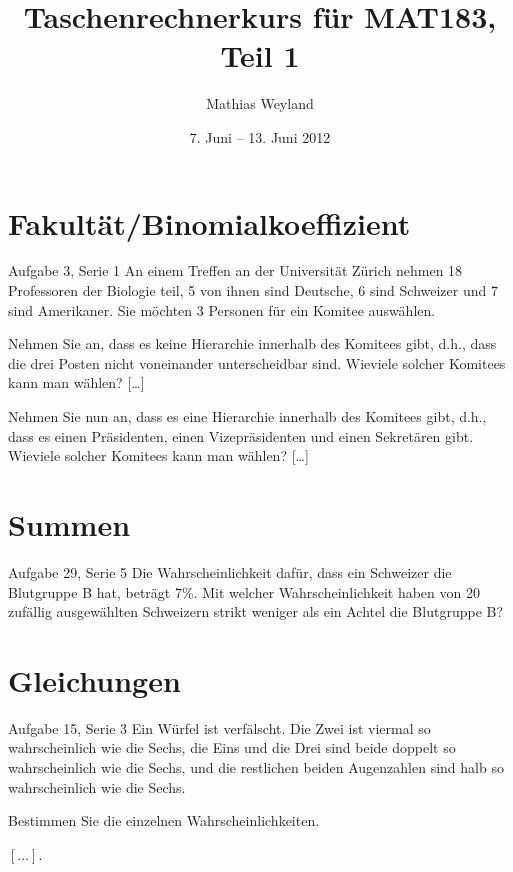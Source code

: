 \documentclass{beamer}
\title{Taschenrechnerkurs für MAT183, Teil 1}
\author{Mathias Weyland}
\date{7. Juni -- 13. Juni 2012}
\begin{document}
\frame{\maketitle}


\section{Fakultät/Binomialkoeffizient}

\begin{frame}{Aufgabe 3, Serie 1}
An einem Treffen an der Universität Zürich nehmen 18 Professoren der Biologie teil, 5 von
ihnen sind Deutsche, 6 sind Schweizer und 7 sind Amerikaner. Sie möchten 3 Personen
für ein Komitee auswählen.

\begin{outline}
\item Nehmen Sie an, dass es keine Hierarchie innerhalb des Komitees gibt, d.h., dass die
drei Posten nicht voneinander unterscheidbar sind. Wieviele solcher Komitees kann
man wählen? [\ldots]\pause
\item Nehmen Sie nun an, dass es eine Hierarchie innerhalb des Komitees gibt, d.h., dass es
einen Präsidenten, einen Vizepräsidenten und einen Sekretären gibt. Wieviele solcher
Komitees kann man wählen? [\ldots]
\end{outline}
\end{frame}

\section{Summen}
\begin{frame}{Aufgabe 29, Serie 5}
Die Wahrscheinlichkeit dafür, dass ein Schweizer die Blutgruppe B hat, beträgt 7\%. Mit
welcher Wahrscheinlichkeit haben von 20 zufällig ausgewählten Schweizern strikt weniger
als ein Achtel die Blutgruppe B?
\end{frame}

\section{Gleichungen}
\begin{frame}{Aufgabe 15, Serie 3}
Ein Würfel ist verfälscht. Die Zwei ist viermal so wahrscheinlich wie die Sechs, die Eins
und die Drei sind beide doppelt so wahrscheinlich wie die Sechs, und die restlichen beiden
Augenzahlen sind halb so wahrscheinlich wie die Sechs.
\begin{outline}
\item Bestimmen Sie die einzelnen Wahrscheinlichkeiten.
\item $[\dots]$.
\end{outline}
\end{frame}
\end{document}

